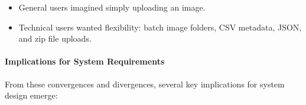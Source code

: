 \documentclass[
  12pt,
  oneside]{article}
\providecommand{\tightlist}{%
  \setlength{\itemsep}{0pt}\setlength{\parskip}{0pt}}
\begin{document}
\begin{enumerate}
  \begin{itemize}
  \tightlist
  \item
    General users imagined simply uploading an image.\\
  \item
    Technical users wanted flexibility: batch image folders, CSV
    metadata, JSON, and zip file uploads.
  \end{itemize}
\end{enumerate}

\paragraph{Implications for System
Requirements}\label{implications-for-system-requirements}

From these convergences and divergences, several key implications for
system design emerge:
\end{document}
